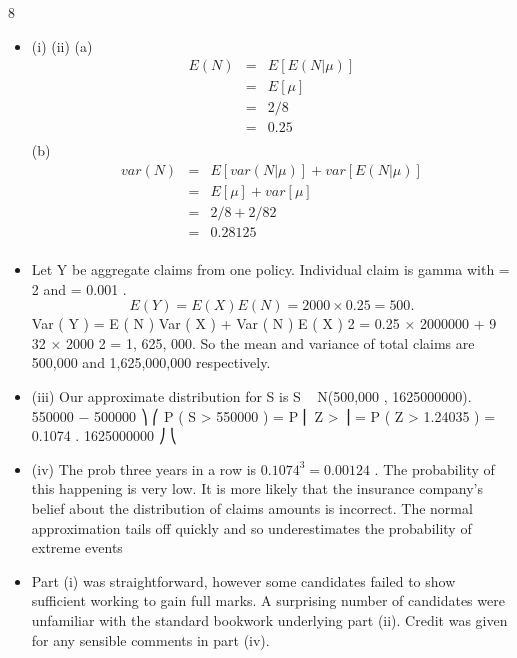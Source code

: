 \documentclass[a4paper,12pt]{article}
\begin{document}
8
\begin{itemize}
\item (i)
(ii)
(a)
\begin{eqnarray*}
E(N) &=& E[E(N|\mu )]\\
&=& E[\mu ] \\
&=& 2/8 \\
&=& 0.25\\
\end{eqnarray*}
(b)
\begin{eqnarray*}
var(N) &=& E[var(N|\mu )] + var[E(N|\mu )]\\
&=& E[\mu ] + var[\mu ]\\
&=& 2/8 + 2/8 2 \\ 
&=& 0.28125\\
\end{eqnarray*}

\item Let Y be aggregate claims from one policy.
Individual claim is gamma with \alpha = 2 and \lambda = 0.001 .
\[E ( Y ) = E ( X ) E ( N ) = 2000 × 0.25 = 500.\]
Var ( Y ) = E ( N ) Var ( X ) + Var ( N ) E ( X ) 2
= 0.25 × 2000000 + 9
32
× 2000 2 = 1, 625, 000.
So the mean and variance of total claims are 500,000 and 1,625,000,000
respectively.
\item (iii)
Our approximate distribution for S is S ~ N(500,000 , 1625000000).
550000 − 500000 ⎞
⎛
P ( S > 550000 ) = P ⎜ Z >
⎟ = P ( Z > 1.24035 ) = 0.1074 .
1625000000 ⎠
⎝
\item (iv)
The prob three years in a row is $0.1074^3 = 0.00124$ .
The probability of this happening is very low. It is more likely that the
insurance company’s belief about the distribution of claims amounts is
incorrect.
The normal approximation tails off quickly and so underestimates the
probability of extreme events
\item Part (i) was straightforward, however some candidates failed to show sufficient working to
gain full marks. A surprising number of candidates were unfamiliar with the standard
bookwork underlying part (ii). Credit was given for any sensible comments in part (iv).
\end{itemize}
\end{document}
